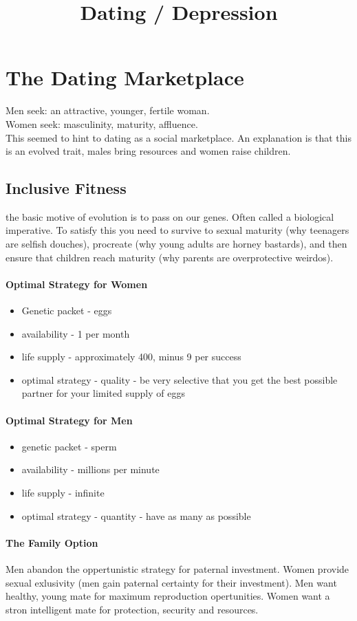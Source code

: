 \documentclass[12pt]{article}
\title{Dating / Depression}
\begin{document}
\section*{The Dating Marketplace}
Men seek: an attractive, younger, fertile woman.\\
Women seek: masculinity, maturity, affluence.\\
This seemed to hint to dating as a social marketplace. An explanation is that this is an evolved trait, males bring resources and women raise children.
\subsection*{Inclusive Fitness}
the basic motive of evolution is to pass on our genes. Often called a biological imperative. To satisfy this you need to survive to sexual maturity (why teenagers are selfish douches), procreate (why young adults are horney bastards), and then ensure that children reach maturity (why parents are overprotective weirdos).
\paragraph*{Optimal Strategy for Women} 
\begin{itemize}
\item Genetic packet - eggs
\item availability - 1 per month
\item life supply - approximately 400, minus 9 per success
\item optimal strategy - quality - be very selective that you get the best possible partner for your limited supply of eggs
\end{itemize}
\paragraph*{Optimal Strategy for Men}
\begin{itemize}
\item genetic packet - sperm
\item availability - millions per minute
\item life supply - infinite
\item optimal strategy - quantity - have as many as possible
\end{itemize}
\paragraph*{The Family Option}
Men abandon the oppertunistic strategy for paternal investment. Women provide sexual exlusivity (men gain paternal certainty for their investment). Men want healthy, young mate for maximum reproduction opertunities. Women want a stron intelligent mate for protection, security and resources.
\end{document}
